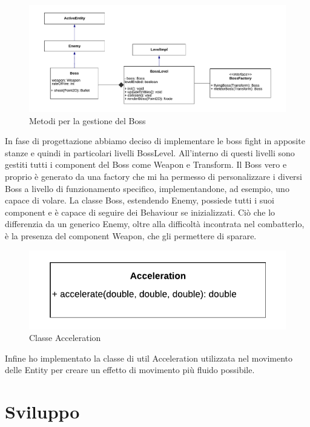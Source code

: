\documentclass[a4paper,12pt]{report}
\begin{document}
\begin{figure}[ht]
\includegraphics[width=1\textwidth]{images/UMLBoss.png}
\caption{Metodi per la gestione del Boss}
\label{fig:boss}
\end{figure}

In fase di progettazione abbiamo deciso di implementare le boss fight in apposite stanze e quindi in particolari livelli BossLevel. All’interno di questi livelli sono gestiti tutti i component del Boss come Weapon e Transform.
Il Boss vero e proprio è generato da una factory che mi ha permesso di personalizzare i diversi Boss a livello di funzionamento specifico, implementandone, ad esempio, uno capace di volare.
La classe Boss, estendendo Enemy, possiede tutti i suoi component e è capace di seguire dei Behaviour se inizializzati. Ciò che lo differenzia da un generico Enemy, oltre alla difficoltà incontrata nel combatterlo, è la presenza del component Weapon, che gli permettere di sparare.

\begin{figure}[ht]
\includegraphics[width=1\textwidth]{images/UMLAcceleration.png}
\caption{Classe Acceleration}
\label{fig:acceleration}
\end{figure}

Infine ho implementato la classe di util Acceleration utilizzata nel movimento delle Entity per creare un effetto di movimento più fluido possibile.

\newpage
\chapter{Sviluppo}
\end{document}
